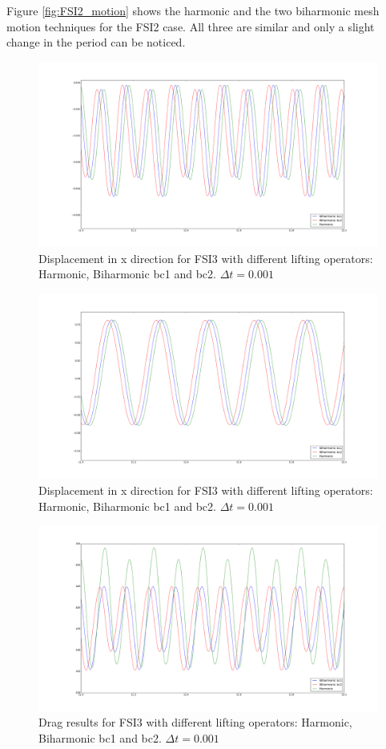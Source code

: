 Figure \ref{fig:FSI2_motion} shows the harmonic and the two biharmonic mesh motion techniques for the FSI2 case. All three are similar and only a slight change in the period can be noticed. 
\begin{figure}[h] 
    \label{FSI31}
    \centering	
    \includegraphics[scale=0.20]{./Mesh_motion_results/FSI3_dt0001_dis_x.png} 
    \caption{Displacement in x direction for FSI3 with different lifting operators: Harmonic, Biharmonic bc1 and bc2. $\Delta t = 0.001$}
\end{figure}
\begin{figure}[H]
    \label{FSI32}
    \centering
    \includegraphics[scale=0.20]{./Mesh_motion_results/FSI3_dt0001_dis_y.png} 
    \caption{Displacement in x direction for FSI3 with different lifting operators: Harmonic, Biharmonic bc1 and bc2. $\Delta t = 0.001$}
\end{figure}
\begin{figure}[H]
    \label{FSI33}
    \centering
    \includegraphics[scale=0.20]{./Mesh_motion_results/FSI3_dt0001_Drag.png} 
    \caption{Drag results for FSI3 with different lifting operators: Harmonic, Biharmonic bc1 and bc2. $\Delta t = 0.001$}
\end{figure}
